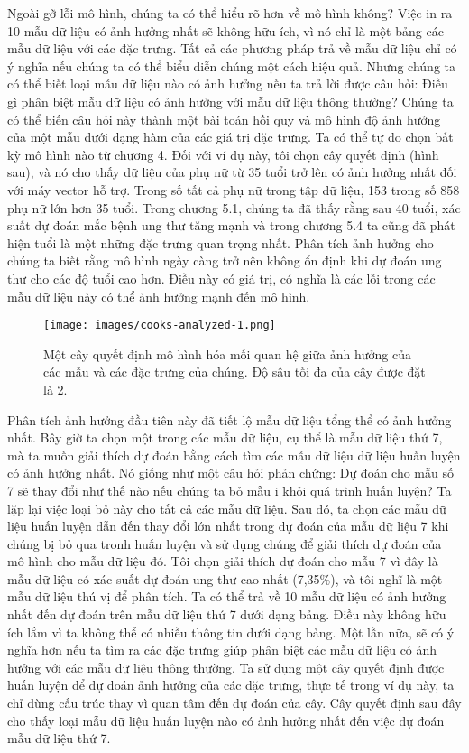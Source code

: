 Ngoài gỡ lỗi mô hình, chúng ta có thể hiểu rõ hơn về mô hình không? Việc in ra 10 mẫu dữ liệu có ảnh hưởng nhất sẽ không hữu ích, vì nó chỉ là một bảng các mẫu dữ liệu với các đặc trưng. Tất cả các phương pháp trả về mẫu dữ liệu chỉ có ý nghĩa nếu chúng ta có thể biểu diễn chúng một cách hiệu quả. Nhưng chúng ta có thể biết loại mẫu dữ liệu nào có ảnh hưởng nếu ta trả lời được câu hỏi: Điều gì phân biệt mẫu dữ liệu có ảnh hưởng với mẫu dữ liệu thông thường? Chúng ta có thể biến câu hỏi này thành một bài toán hồi quy và  mô hình độ ảnh hưởng của một mẫu dưới dạng hàm của các giá trị đặc trưng. Ta có thể tự do chọn bất kỳ mô hình nào từ chương 4. Đối với ví dụ này, tôi chọn cây quyết định (hình sau), và nó cho thấy dữ liệu của phụ nữ từ 35 tuổi trở lên có ảnh hưởng nhất đối với máy vector hỗ trợ. Trong số tất cả phụ nữ trong tập dữ liệu, 153 trong số 858 phụ nữ lớn hơn 35 tuổi. Trong chương 5.1, chúng ta đã thấy rằng sau 40 tuổi, xác suất dự đoán mắc bệnh ung thư tăng mạnh và trong chương 5.4 ta cũng đã phát hiện tuổi là một những đặc trưng quan trọng nhất. Phân tích ảnh hưởng cho chúng ta biết rằng mô hình ngày càng trở nên không ổn định khi dự đoán ung thư cho các độ tuổi cao hơn. Điều này có giá trị, có nghĩa là các lỗi trong các mẫu dữ liệu này có thể ảnh hưởng mạnh đến mô hình.

\begin{figure}[h!]
    \centering
    \texttt{[image: images/cooks-analyzed-1.png]}
    \caption{Một cây quyết định mô hình hóa mối quan hệ giữa ảnh hưởng của các mẫu và các đặc trưng của chúng. Độ sâu tối đa của cây được đặt là 2.}
    \label{fig:6_14}
\end{figure}

Phân tích ảnh hưởng đầu tiên này đã tiết lộ mẫu dữ liệu tổng thể có ảnh hưởng nhất. Bây giờ ta chọn một trong các mẫu dữ liệu, cụ thể là mẫu dữ liệu thứ 7, mà ta muốn giải thích dự đoán bằng cách tìm các mẫu dữ liệu dữ liệu huấn luyện có ảnh hưởng nhất. Nó giống như một câu hỏi phản chứng: Dự đoán cho mẫu số 7 sẽ thay đổi như thế nào nếu chúng ta bỏ mẫu i khỏi quá trình huấn luyện? Ta lặp lại việc loại bỏ này cho tất cả các mẫu dữ liệu. Sau đó, ta chọn các mẫu dữ liệu huấn luyện dẫn đến thay đổi lớn nhất trong dự đoán của mẫu dữ liệu 7 khi chúng bị bỏ qua tronh huấn luyện và sử dụng chúng để giải thích dự đoán của mô hình cho mẫu dữ liệu đó. Tôi chọn giải thích dự đoán cho mẫu 7 vì đây là mẫu dữ liệu có xác suất dự đoán ung thư cao nhất (7,35\%), và tôi nghĩ là một mẫu dữ liệu thú vị để phân tích. Ta có thể trả về 10 mẫu dữ liệu có ảnh hưởng nhất đến dự đoán trên mẫu dữ liệu thứ 7 dưới dạng bảng. Điều này không hữu ích lắm vì ta không thể có nhiều thông tin dưới dạng bảng. Một lần nữa, sẽ có ý nghĩa hơn nếu ta tìm ra các đặc trưng giúp phân biệt các mẫu dữ liệu có ảnh hưởng với các mẫu dữ liệu thông thường. Ta sử dụng một cây quyết định được huấn luyện để dự đoán ảnh hưởng của các đặc trưng, thực tế trong ví dụ này, ta chỉ dùng cấu trúc thay vì quan tâm đến dự đoán của cây. Cây quyết định sau đây cho thấy loại mẫu dữ liệu huấn luyện nào có ảnh hưởng nhất đến việc dự đoán mẫu dữ liệu thứ 7.

